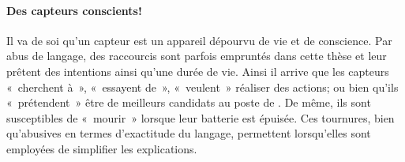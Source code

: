             \paragraph{Des capteurs conscients!}
Il va de soi qu'un capteur est un appareil dépourvu de vie et de conscience.
Par abus de langage, des raccourcis sont parfois empruntés dans cette thèse et leur prêtent des intentions ainsi qu'une durée de vie.
Ainsi il arrive que les capteurs « cherchent à », « essayent de », « veulent » réaliser des actions; ou bien qu'ils « prétendent » être de meilleurs candidats au poste de \ch.
De même, ils sont susceptibles de « mourir » lorsque leur batterie est épuisée.
Ces tournures, bien qu'abusives en termes d'exactitude du langage, permettent lorsqu'elles sont employées de simplifier les explications.
